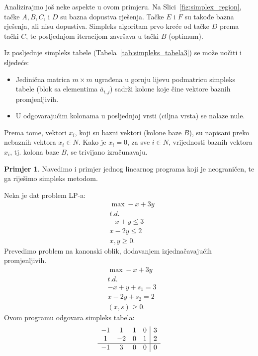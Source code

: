 \documentclass[a4paper, utf8, 11pt, colorlinks]{book}
\theoremstyle{definition}
\newtheorem{primjer}{Primjer}[chapter]
\begin{document}
 Analizirajmo još neke aspekte u ovom primjeru. Na Slici~\ref{fig:simplex_region}, tačke $A, B, C$, i $D$ su bazna dopustva rješenja. Tačke $E$ i $F$ su takođe bazna rješenja, ali nisu dopustiva. Simpleks algoritam prvo kreće od tačke $D$ prema tački $C$, te posljednjom iteracijom završava u tački $B$ (optimum).
 
 
 Iz posljednje simpleks tabele (Tabela~\ref{tab:simpleks_tabela3}) se može uočiti i sljedeće:
 \begin{itemize}
     \item Jedinična matrica $m \times m$   ugrađena u gornju lijevu podmatricu simpleks tabele (blok sa elementima $\overline{a}_{i,j}$) sadrži kolone koje čine vektore baznih promjenljivih.
     \item U odgovarajućim kolonama u posljednjoj vrsti (ciljna vrsta) se nalaze nule.
 \end{itemize}
 Prema tome, vektori $x_i$, koji su bazni vektori (kolone baze $B$), su napisani preko nebaznih vektora $x_i \in N$. Kako je $x_i  = 0$, za sve $i \in N$, vrijednosti baznih vektora $x_i$, tj. kolona baze $B$, se trivijano izračunavaju.

\begin{primjer} Navedimo i primjer jednog linearnog programa koji je neograničen, te ga riješimo simpleks metodom. 
\end{primjer}
  Neka je dat problem LP-a:
  \begin{align*}
  	  &\max -x + 3y \\
  	  &  {t.d.} \nonumber \\
  	  & -x + y \leq 3 \\
  	  & x - 2y \leq 2 \\
  	  & x,y \geq 0.
  \end{align*}
 Prevedimo problem na kanonski oblik, dodavanjem izjednačavajućih promjenljivih. 
 \begin{align*}
      &\max -x + 3y \\
      &  {t.d.} \nonumber \\
     & -x + y + s_1 = 3 \\
     & x - 2y + s_2 = 2  \\
     & (x,s) \geq 0.
 \end{align*}
Ovom programu odgovara simpleks tabela:
$$\begin{array}{cccc| c} 
	   -1 & 1  & 1 & 0 & 3 \\
	    1 & -2 & 0 & 1 & 2 \\ \hline
	   -1 & 3  & 0 & 0 & 0  
\end{array}$$
 
\end{document}
